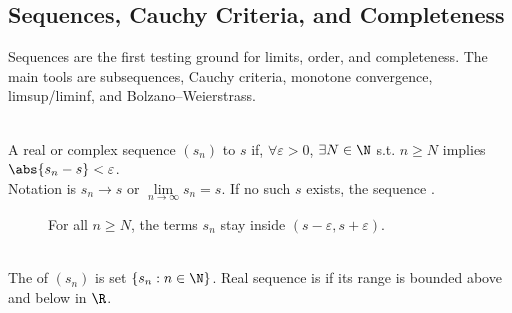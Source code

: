 \subsection{Sequences, Cauchy Criteria, and Completeness}

%

Sequences are the first testing ground for limits, order, and completeness. The main tools are subsequences, Cauchy criteria, monotone convergence, limsup/liminf, and Bolzano--Weierstrass.

\begin{definition} \label{def:real-complex-sequence-convergence} \\
A real or complex sequence $(s_n)$  to $s$ if, $\forall \varepsilon>0$, $\exists N\in\N$ s.t. $n\geq N$ implies $\abs{s_n-s}<\varepsilon$.\\
Notation is $s_n\to s$ or $\lim\limits_{n\to\infty}s_n=s$. If no such $s$ exists, the sequence .
\end{definition}

\begin{figure}[H]
  \centering
  
  \caption{For all $n\geq N$, the terms $s_n$ stay inside $(s-\varepsilon,s+\varepsilon)$.}
  \label{fig:sequence-epsilon-neighborhood}
\end{figure}

\begin{definition} \label{def:real-sequence-range-and-boundedness} \\
The  of $(s_n)$ is set $\{s_n:n\in\N\}$. Real sequence is  if its range is bounded above and below in $\R$.
\end{definition}

